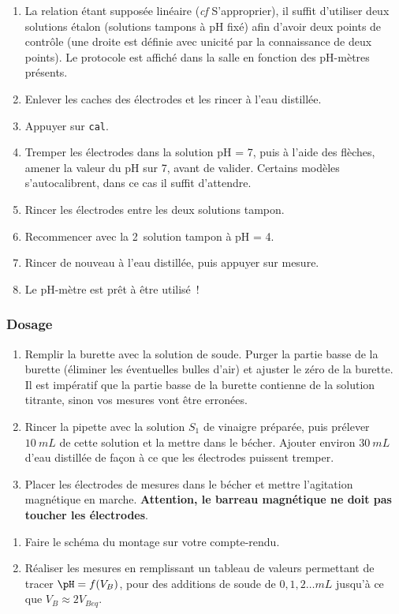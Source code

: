 \documentclass[a4paper, 10pt, final, garamond]{book}
\begin{document}
\begin{enumerate}
    \item La relation étant supposée linéaire (\textit{cf} S'approprier), il
        suffit d'utiliser deux solutions étalon (solutions tampons à pH fixé)
        afin d'avoir deux points de contrôle (une droite est définie avec
        unicité par la connaissance de deux points). Le protocole est affiché
        dans la salle en fonction des pH-mètres présents.
    \item Enlever les caches des électrodes et les rincer à l'eau distillée.
    \item Appuyer sur \texttt{cal}.
    \item Tremper les électrodes dans la solution pH = 7, puis à l'aide des
        flèches, amener la valeur du pH sur 7, avant de valider. Certains
        modèles s'autocalibrent, dans ce cas il suffit d'attendre. 
    \item Rincer les électrodes entre les deux solutions tampon.
    \item Recommencer avec la 2\ieme\ solution tampon à pH = 4.
    \item Rincer de nouveau à l'eau distillée, puis appuyer sur mesure.
    \item Le pH-mètre est prêt à être utilisé~!
\end{enumerate}

\subsubsection{Dosage}

\begin{enumerate}
    \item Remplir la burette avec la solution de soude. Purger la partie basse
        de la burette (éliminer les éventuelles bulles d'air) et ajuster le zéro
        de la burette. Il est impératif que la partie basse de la burette
        contienne de la solution titrante, sinon vos mesures vont être erronées. 
    \item Rincer la pipette avec la solution $S_1$ de vinaigre préparée, puis
        prélever $\SI{10}{mL}$ de cette solution et la mettre dans le bécher.
        Ajouter environ $\SI{30}{mL}$ d'eau distillée de façon à ce que les
        électrodes puissent tremper.
    \item Placer les électrodes de mesures dans le bécher et mettre l'agitation
        magnétique en marche. \textbf{Attention, le barreau magnétique ne doit
        pas toucher les électrodes}.
\end{enumerate}
\begin{enumerate}[label=\sqenumi, start=5]
    \item Faire le schéma du montage sur votre compte-rendu.
    \item Réaliser les mesures en remplissant un tableau de valeurs permettant
        de tracer $\pH = f(V_B)$, pour des additions de soude de $0,1,2… \si{mL}$
        jusqu'à ce que $V_B \approx 2 V_{Beq}$.
\end{enumerate}
\end{document}
